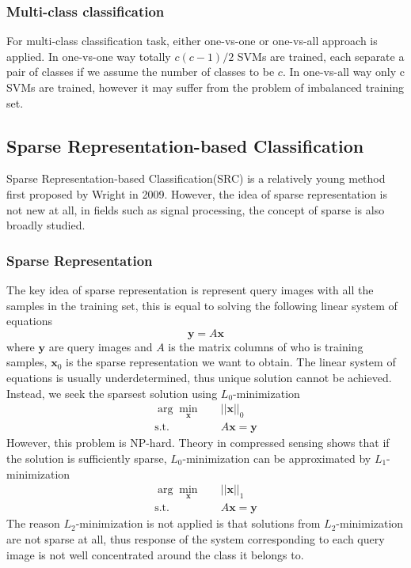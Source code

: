 \documentclass[conference]{IEEEtran}
\begin{document}
\subsubsection{Multi-class classification}
For multi-class classification task, either one-vs-one or one-vs-all approach is applied\cite{heisele2001face}. In one-vs-one way totally $c(c-1)/2$ SVMs are trained, each separate a pair of classes if we assume the number of classes to be $c$. In one-vs-all way only c SVMs are trained, however it may suffer from the problem of imbalanced training set.
\subsection{Sparse Representation-based Classification}
Sparse Representation-based Classification(SRC) is a relatively young method first proposed by Wright in 2009\cite{wright2009robust}. However, the idea of sparse representation is not new at all, in fields such as signal processing, the concept of sparse is also broadly studied. 
\subsubsection{Sparse Representation}
The key idea of sparse representation is represent query images with all the samples in the training set, this is equal to solving the following linear system of equations
\begin{equation}
	\bm{y}=A\bm{x}
\end{equation}
where $\bm{y}$ are query images and $A$ is the matrix columns of who is training samples, $\bm{x}_0$ is the sparse representation we want to obtain. The linear system of equations is usually underdetermined, thus unique solution cannot be achieved. Instead, we seek the sparsest solution using $L_0$-minimization
\begin{equation}
	\begin{split}
		\arg \min_{\bm{x}}\quad&||\bm{x}||_0\\
		\textrm{s.t.}\quad & A\bm{x}=\bm{y}
	\end{split}
\end{equation}
However, this problem is NP-hard\cite{amaldi1998approximability}. Theory in compressed sensing shows that if the solution is sufficiently sparse, $L_0$-minimization can be approximated by $L_1$-minimization\cite{wangrobust}
\begin{equation}
\begin{split}
\arg \min_{\bm{x}}\quad&||\bm{x}||_1\\
\textrm{s.t.}\quad & A\bm{x}=\bm{y}
\end{split}
\end{equation}
The reason $L_2$-minimization is not applied is that solutions from $L_2$-minimization are not sparse at all\cite{wright2009robust}, thus response of the system corresponding to each query image is not well concentrated around the class it belongs to.
\end{document}
